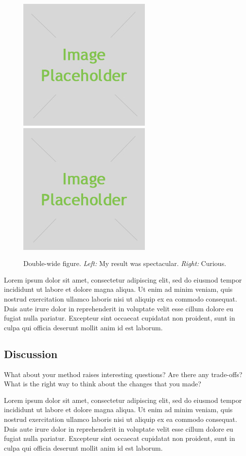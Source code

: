 \documentclass[10pt,twocolumn,letterpaper]{article}
\begin{document}
\begin{figure}[t]
    \centering
    \includegraphics[width=0.4\linewidth]{placeholder.jpg}
    \includegraphics[width=0.4\linewidth]{placeholder.jpg}
    \caption{Double-wide figure. \emph{Left:} My result was spectacular. \emph{Right:} Curious.}
    \label{fig:result2}
\end{figure}

Lorem ipsum dolor sit amet, consectetur adipiscing elit, sed do eiusmod tempor incididunt ut labore et dolore magna aliqua. Ut enim ad minim veniam, quis nostrud exercitation ullamco laboris nisi ut aliquip ex ea commodo consequat. Duis aute irure dolor in reprehenderit in voluptate velit esse cillum dolore eu fugiat nulla pariatur. Excepteur sint occaecat cupidatat non proident, sunt in culpa qui officia deserunt mollit anim id est laborum.

\subsection{Discussion}

What about your method raises interesting questions? Are there any trade-offs? What is the right way to think about the changes that you made?

Lorem ipsum dolor sit amet, consectetur adipiscing elit, sed do eiusmod tempor incididunt ut labore et dolore magna aliqua. Ut enim ad minim veniam, quis nostrud exercitation ullamco laboris nisi ut aliquip ex ea commodo consequat. Duis aute irure dolor in reprehenderit in voluptate velit esse cillum dolore eu fugiat nulla pariatur. Excepteur sint occaecat cupidatat non proident, sunt in culpa qui officia deserunt mollit anim id est laborum.
\end{document}
